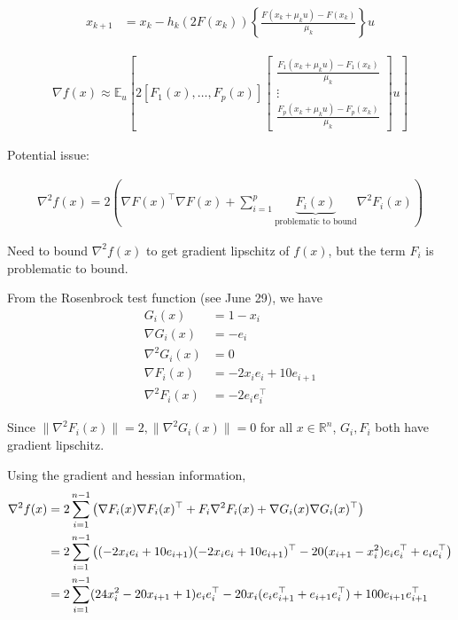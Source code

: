 \documentclass{article}
\begin{document}
\begin{align}
x_{k+1} & = x_k - h_k(2F(x_k))\left\{\frac{F(x_k+\mu_ku) - F(x_k)}{\mu_k}\right\}u
\end{align}

\begin{align}
\nabla f(x) \approx \mathbb{E}_u\left[2 [F_1(x), \dots, F_p(x)]\begin{bmatrix} \frac{F_1(x_k+\mu_ku) - F_1(x_k)}{\mu_k} \\ \vdots \\ \frac{F_p(x_k+\mu_ku) - F_p(x_k)}{\mu_k} \end{bmatrix}u\right] \label{inner_forward_difference}
\end{align}

Potential issue: 

\begin{align}
\nabla^2 f(x) = 2\left(\nabla F(x)^\top \nabla F(x) + \sum_{i=1}^p\underbrace{F_i(x)}_{\text{problematic to bound}}\nabla^2F_i(x)\right) 
\end{align}

Need to bound $\nabla^2f(x)$ to get gradient lipschitz of $f(x)$, but the term $F_i$ is problematic to bound. \newline 

From the Rosenbrock test function (see June 29), we have 
\begin{align}
G_i(x) & = 1 - x_i \\ \nabla G_i(x) & = -e_i \\ \nabla^2G_i(x) & = 0 \\ \nabla F_i(x) & = -2x_ie_i + 10e_{i+1} \\ \nabla^2F_i(x) & = -2e_ie_i^\top
\end{align}

Since $\|\nabla^2F_i(x)\| = 2, \| \nabla^2 G_i(x)\| = 0$ for all $x \in \mathbb{R}^n$, $G_i, F_i$ both have gradient lipschitz. \newline 

Using the gradient and hessian information, 
\begin{align}
\nabla^2 f(x) & = 2\sum_{i=1}^{n-1}\left(\nabla F_i(x)\nabla F_i(x)^\top + F_i \nabla^2F_i(x) + \nabla G_i(x) \nabla G_i(x)^\top\right) \notag \\ & = 2\sum_{i=1}^{n-1}\left((-2x_ie_i + 10e_{i+1})(-2x_ie_i + 10e_{i+1})^\top - 20(x_{i+1}-x_i^2)e_ie_i^\top + e_ie_i^\top\right) \notag \\ & = 2\sum_{i=1}^{n-1}(24x_i^2 - 20x_{i+1} + 1)e_ie_i^\top - 20x_i(e_ie_{i+1}^\top + e_{i+1}e_i^\top) + 100e_{i+1}e_{i+1}^\top
\end{align}
\end{document}

